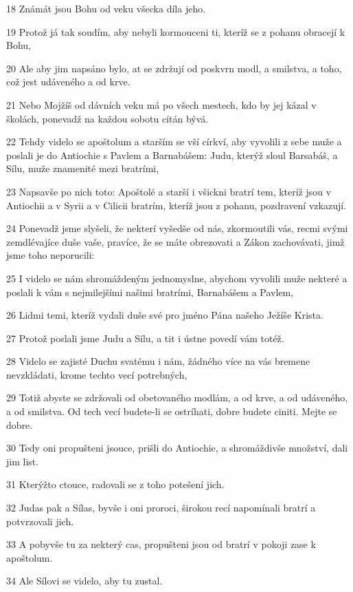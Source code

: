 \par 18 Známát jsou Bohu od veku všecka díla jeho.
\par 19 Protož já tak soudím, aby nebyli kormouceni ti, kteríž se z pohanu obracejí k Bohu,
\par 20 Ale aby jim napsáno bylo, at se zdržují od poskvrn modl, a smilstva, a toho, což jest udáveného a od krve.
\par 21 Nebo Mojžíš od dávních veku má po všech mestech, kdo by jej kázal v školách, ponevadž na každou sobotu cítán bývá.
\par 22 Tehdy videlo se apoštolum a starším se vší církví, aby vyvolili z sebe muže a poslali je do Antiochie s Pavlem a Barnabášem: Judu, kterýž sloul Barsabáš, a Sílu, muže znamenité mezi bratrími,
\par 23 Napsavše po nich toto: Apoštolé a starší i všickni bratrí tem, kteríž jsou v Antiochii a v Syrii a v Cilicii bratrím, kteríž jsou z pohanu, pozdravení vzkazují.
\par 24 Ponevadž jsme slyšeli, že nekterí vyšedše od nás, zkormoutili vás, recmi svými zemdlévajíce duše vaše, pravíce, že se máte obrezovati a Zákon zachovávati, jimž jsme toho neporucili:
\par 25 I videlo se nám shromáždeným jednomyslne, abychom vyvolili muže nekteré a poslali k vám s nejmilejšími našimi bratrími, Barnabášem a Pavlem,
\par 26 Lidmi temi, kteríž vydali duše své pro jméno Pána našeho Ježíše Krista.
\par 27 Protož poslali jsme Judu a Sílu, a tit i ústne povedí vám totéž.
\par 28 Videlo se zajisté Duchu svatému i nám, žádného více na vás bremene nevzkládati, krome techto vecí potrebných,
\par 29 Totiž abyste se zdržovali od obetovaného modlám, a od krve, a od udáveného, a od smilstva. Od tech vecí budete-li se ostríhati, dobre budete ciniti. Mejte se dobre.
\par 30 Tedy oni propušteni jsouce, prišli do Antiochie, a shromáždivše množství, dali jim list.
\par 31 Kterýžto ctouce, radovali se z toho potešení jich.
\par 32 Judas pak a Sílas, byvše i oni proroci, širokou recí napomínali bratrí a potvrzovali jich.
\par 33 A pobyvše tu za nekterý cas, propušteni jsou od bratrí v pokoji zase k apoštolum.
\par 34 Ale Sílovi se videlo, aby tu zustal.
